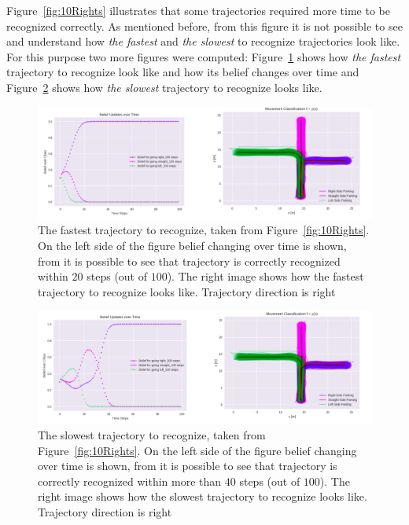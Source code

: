 Figure~\ref{fig:10Rights} illustrates that some trajectories required more time to be recognized correctly. As mentioned before, from this figure it is not possible to see and understand how \textit{the fastest} and \textit{the slowest} to recognize trajectories look like. For this purpose two more figures were computed: Figure~\ref{fig:RightGood} shows how \textit{the fastest} trajectory to recognize look like and how its belief changes over time and Figure~\ref{fig:RightBad} shows how \textit{the slowest} trajectory to recognize looks like.

\begin{figure}[H]
	\centering  	
	\includegraphics[width=13cm]{img/right_good.png}
	\caption{The fastest trajectory to recognize, taken from Figure~\ref{fig:10Rights}. On the left side of the figure belief changing over time is shown, from it is possible to see that trajectory is correctly recognized within $20$ steps (out of $100$). The right image shows how the fastest trajectory to recognize looks like. Trajectory direction is right}
	\label{fig:RightGood}    
\end{figure}

\begin{figure}[H]
	\centering  	
	\includegraphics[width=13cm]{img/rightbad.png}
	\caption{The slowest trajectory to recognize, taken from Figure~\ref{fig:10Rights}. On the left side of the figure belief changing over time is shown, from it is possible to see that trajectory is correctly recognized within more than $40$ steps (out of $100$). The right image shows how the slowest trajectory to recognize looks like. Trajectory direction is right}
	\label{fig:RightBad}    
\end{figure}


